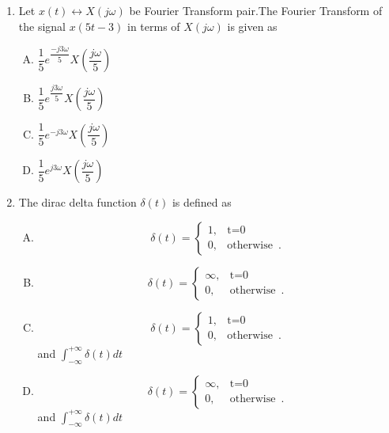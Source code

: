 \documentclass[journal,12pt,twocolumn]{IEEEtran}
\begin{document}
\begin{enumerate}
\begin{enumerate}[(A)]
\end{enumerate}


\item Let $x(t)\leftrightarrow X(j\omega)$ be Fourier Transform pair.The Fourier Transform of the signal $x(5t-3)$ in terms of $X(j\omega)$ is given as\\
\begin{enumerate}[(A)]

\setlength\itemsep{2em}

\item $
\dfrac{1}{5}e^{\dfrac{-j3\omega}{5}}X(\dfrac{j\omega}{5})
$ 
\item $
\dfrac{1}{5}e^{\dfrac{j3\omega}{5}}X(\dfrac{j\omega}{5})
$ 
\item  $
\dfrac{1}{5}e^{-j3\omega}X(\dfrac{j\omega}{5})
$ 
\item $
\dfrac{1}{5}e^{j3\omega}X(\dfrac{j\omega}{5})
$

\end{enumerate}




\item The dirac delta function $\delta(t)$ is defined as

\begin{enumerate}[(A)]

\setlength\itemsep{2em}

\item \[
	\delta(t)=\begin{cases}
		1, & \text{t=0}  \\
		0, & \text{otherwise }\,.
	\end{cases}
\]
\item \[
	\delta(t)=\begin{cases}
		\infty, & \text{t=0}  \\
		0, & \text{otherwise }\,.
	\end{cases}
\]
\item \[
	\delta(t)=\begin{cases}
		1, & \text{t=0}  \\
		0, & \text{otherwise }\,.
	\end{cases}
\] and \hspace{3mm}$\int_{-\infty}^{+\infty} \delta(t) dt$
\item \[
	\delta(t)=\begin{cases}
		\infty, & \text{t=0}  \\
		0, & \text{otherwise }\,.
	\end{cases}
\] and \hspace{3mm} $\int_{-\infty}^{+\infty} \delta(t) dt$



\end{enumerate}
\end{enumerate}
\end{document}
